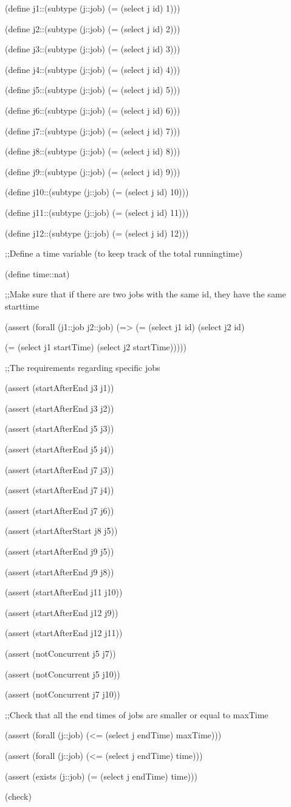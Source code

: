 \documentclass[12pt]{article}
\begin{document}
{{(define j1::(subtype (j::job) (= (select j id) 1)))

(define j2::(subtype (j::job) (= (select j id) 2)))

(define j3::(subtype (j::job) (= (select j id) 3)))

(define j4::(subtype (j::job) (= (select j id) 4)))

(define j5::(subtype (j::job) (= (select j id) 5)))

(define j6::(subtype (j::job) (= (select j id) 6)))

(define j7::(subtype (j::job) (= (select j id) 7)))

(define j8::(subtype (j::job) (= (select j id) 8)))

(define j9::(subtype (j::job) (= (select j id) 9)))

(define j10::(subtype (j::job) (= (select j id) 10)))

(define j11::(subtype (j::job) (= (select j id) 11)))

(define j12::(subtype (j::job) (= (select j id) 12)))


;;Define a time variable (to keep track of the total runningtime)

(define time::nat)


;;Make sure that if there are two jobs with the same id, they have the same starttime

(assert (forall (j1::job j2::job) (=> (= (select j1 id) (select j2 id) 

 (= (select j1 startTime) (select j2 startTime)))))


;;The requirements regarding specific jobs

(assert (startAfterEnd j3 j1))

(assert (startAfterEnd j3 j2))

(assert (startAfterEnd j5 j3))

(assert (startAfterEnd j5 j4))

(assert (startAfterEnd j7 j3))

(assert (startAfterEnd j7 j4))

(assert (startAfterEnd j7 j6))


(assert (startAfterStart j8 j5))


(assert (startAfterEnd j9 j5))

(assert (startAfterEnd j9 j8))

(assert (startAfterEnd j11 j10))

(assert (startAfterEnd j12 j9))

(assert (startAfterEnd j12 j11))


(assert (notConcurrent j5 j7))

(assert (notConcurrent j5 j10))

(assert (notConcurrent j7 j10))


;;Check that all the end times of jobs are smaller or equal to maxTime

(assert (forall (j::job) (<= (select j endTime) maxTime)))

(assert (forall (j::job) (<= (select j endTime) time)))

(assert (exists (j::job) (= (select j endTime) time)))


(check)}
}
\end{document}
